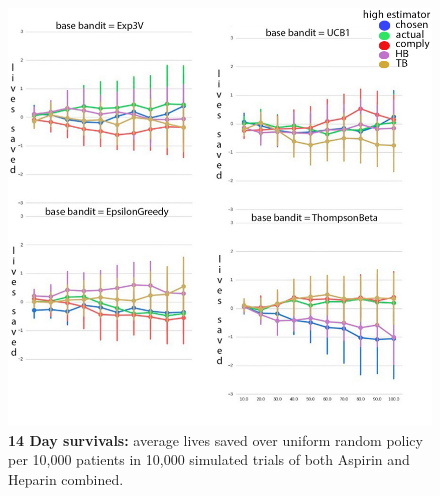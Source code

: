 \begin{figure}
\begin{center}
\includegraphics[width=1\columnwidth]{bandit/figs/fig1a.png}
\caption{\textbf{14 Day survivals:} average lives saved over uniform random policy per 10,000 patients in 10,000 simulated trials of both Aspirin and Heparin combined.}
\label{fig1a}
\end{center}
\end{figure} 

